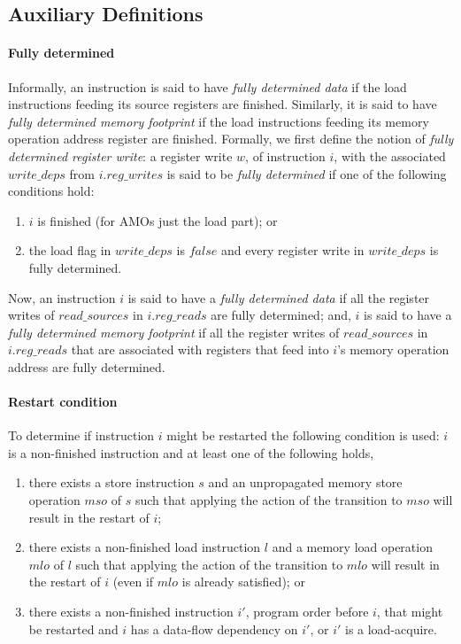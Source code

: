 \subsection{Auxiliary Definitions}\label{sec:omm:aux}
\paragraph{Fully determined}
Informally, an instruction is said to have {\it fully determined data} if the load instructions feeding its source registers are finished.
Similarly, it is said to have {\it fully determined memory footprint} if the load instructions feeding its memory operation address register are finished.
%
Formally, we first define the notion of {\it fully determined register write}: a register write $w$, of instruction $i$, with the associated $write\_deps$ from $i.reg\_writes$ is said to be {\it fully determined} if one of the following conditions hold:
\begin{enumerate}
\item $i$ is finished (for AMOs just the load part); or
\item the load flag in $write\_deps$ is $false$ and every register write in $write\_deps$ is fully determined.
\end{enumerate}
Now, an instruction $i$ is said to have a {\it fully determined data} if all the register writes of $read\_sources$ in $i.reg\_reads$ are fully determined;
and, $i$ is said to have a {\it fully determined memory footprint} if all the register writes of $read\_sources$ in $i.reg\_reads$ that are associated with registers that feed into $i$'s memory operation address are fully determined.


\paragraph{Restart condition}\label{omm:restart_condition}
To determine if instruction $i$ might be restarted the following condition is used: $i$ is a non-finished instruction and at least one of the following holds,
\begin{enumerate}
\item there exists a store instruction $s$ and an unpropagated memory store operation $mso$ of $s$ such that applying the action of the  transition to $mso$ will result in the restart of $i$;
\item there exists a non-finished load instruction $l$ and a memory load operation $mlo$ of $l$ such that applying the action of the  transition to $mlo$ will result in the restart of $i$ (even if $mlo$ is already satisfied); or
\item there exists a non-finished instruction $i'$, program order before $i$, that might be restarted and $i$ has a data-flow dependency on $i'$, or $i'$ is a load-acquire.
\end{enumerate}
